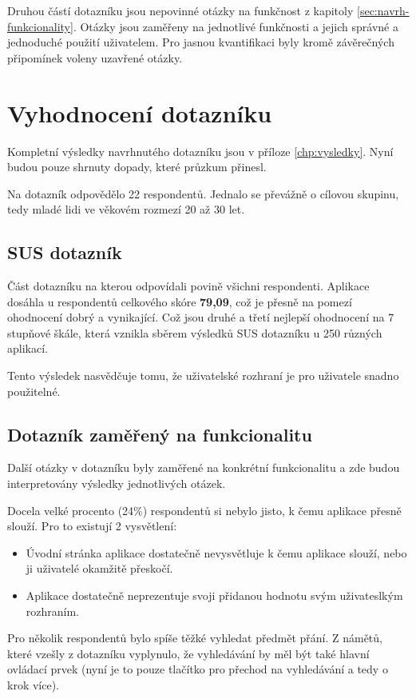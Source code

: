 Druhou částí dotazníku jsou nepovinné otázky na funkčnost z kapitoly \ref{sec:navrh-funkcionality}. Otázky jsou zaměřeny na jednotlivé funkčnosti a jejich správné a jednoduché použití uživatelem. Pro jasnou kvantifikaci byly kromě závěrečných připomínek voleny uzavřené otázky.


\section{Vyhodnocení dotazníku}
\label{sec:vyhodnoceni-dotazniku}
Kompletní výsledky navrhnutého dotazníku jsou v příloze \ref{chp:vysledky}. Nyní budou pouze shrnuty dopady, které průzkum přinesl.

Na dotazník odpovědělo 22 respondentů. Jednalo se převážně o cílovou skupinu, tedy mladé lidi ve věkovém rozmezí 20 až 30 let.

\subsection{SUS dotazník}
Část dotazníku na kterou odpovídali povině všichni respondenti. Aplikace dosáhla u respondentů celkového skóre \textbf{79,09}, což je přesně na pomezí ohodnocení dobrý a vynikající\cite{bangor2009determining}. Což jsou druhé a třetí nejlepší ohodnocení na 7 stupňové škále, která vznikla sběrem výsledků SUS dotazníku u 250 různých aplikací\cite{bangor2009determining}.

Tento výsledek nasvědčuje tomu, že uživatelské rozhraní je pro uživatele snadno použitelné.

\subsection{Dotazník zaměřený na funkcionalitu}
Další otázky v dotazníku byly zaměřené na konkrétní funkcionalitu a zde budou interpretovány výsledky jednotlivých otázek.

Docela velké procento (24\%) respondentů si nebylo jisto, k čemu aplikace přesně slouží. Pro to existují 2 vysvětlení:
\begin{itemize}
\item Úvodní stránka aplikace dostatečně nevysvětluje k čemu aplikace slouží, nebo ji uživatelé okamžitě přeskočí.
\item Aplikace dostatečně neprezentuje svoji přidanou hodnotu svým uživateslkým rozhraním.
\end{itemize}

Pro několik respondentů bylo spíše těžké vyhledat předmět přání. Z námětů, které vzešly z dotazníku vyplynulo, že vyhledávání by měl být také hlavní ovládací prvek (nyní je to pouze tlačítko pro přechod na vyhledávání a tedy o krok více).

